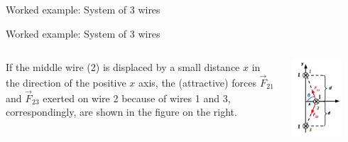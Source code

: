 {\begin{frame}{Worked example: System of 3 wires}
\end{frame}

%
%
%

\begin{frame}{Worked example: System of 3 wires}

  \begin{columns}
    \begin{column}{0.40\textwidth}
      If the middle wire (2) is displaced by a small distance $x$ in the direction of
      the positive $x$ axis, the (attractive) forces $\vec{F}_{21}$ and $\vec{F}_{23}$
      exerted on wire 2 because of wires 1 and 3, correspondingly, are shown in
      the figure on the right.
    \end{column}
    \begin{column}{0.60\textwidth}
      \begin{center}
        \includegraphics[width=0.70\textwidth]{./images/problems/lect06_3wires_sol_b_1}
      \end{center}
    \end{column}
  \end{columns}

\end{frame}

%
%
%

}
